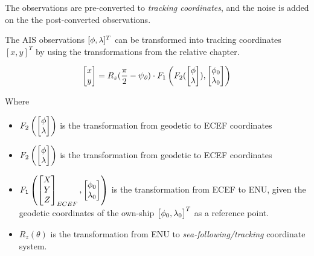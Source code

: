 The observations are pre-converted to \emph{tracking coordinates}, and the noise is added on the the post-converted observations.

The AIS observations $[{\phi}, {\lambda}]^{T}$ can be transformed into tracking coordinates $[x,y]^{T}$ by using the transformations from the relative chapter.


\begin{equation}
\begin{bmatrix}
x \\
y
\end{bmatrix} = R_z(\frac{\pi}{2}-{\psi}_{\textit{0}}) \cdot F_1\left(F_2(\begin{bmatrix}
{\phi} \\
{\lambda}
\end{bmatrix}),\begin{bmatrix}
{\phi}_0 \\ {\lambda}_0
\end{bmatrix}\right)
\end{equation}

Where

\begin{itemize}
	\item $F_2\left(\begin{bmatrix}
	{\phi} \\
	{\lambda}
	\end{bmatrix}\right)$ is the transformation from geodetic to ECEF coordinates
	\item $F_2\left(\begin{bmatrix}
	{\phi} \\
	{\lambda}
	\end{bmatrix}\right)$ is the transformation from geodetic to ECEF coordinates
	\item $F_1\left( \begin{bmatrix}
	X \\
	Y \\
	Z
	\end{bmatrix}_{ECEF},\begin{bmatrix}
	{\phi}_0 \\
	{\lambda}_0
	\end{bmatrix}\right)$ is the transformation from ECEF to ENU, given the geodetic coordinates of the own-ship $\begin{bmatrix}
	{\phi}_0,
	{\lambda}_0
	\end{bmatrix}^T$ as a reference point.
	\item $R_z(\theta)$ is the transformation from ENU to \emph{sea-following/tracking }coordinate system.
\end{itemize}

